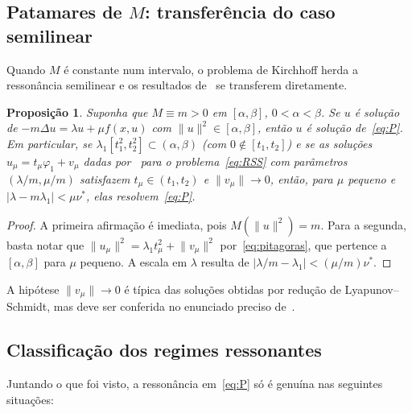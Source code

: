 \documentclass[11pt,a4paper]{article}
\theoremstyle{plain}
\newtheorem{proposicao}[teorema]{Proposição}
\theoremstyle{definition}
\theoremstyle{remark}
\newcommand{\norm}[1]{\lVert #1\rVert}
\newcommand{\abs}[1]{\lvert #1\rvert}
\begin{document}
\subsection{Patamares de \texorpdfstring{$M$}{M}: transferência do caso semilinear}

Quando $M$ é constante num intervalo, o problema de Kirchhoff herda a
ressonância semilinear e os resultados de~\cite{RezendeSanchezSilva2019} se
transferem diretamente.

\begin{proposicao}\label{prop:patamar}
Suponha que $M\equiv m>0$ em $[\alpha,\beta]$, $0<\alpha<\beta$. Se $u$ é
solução de $-m\Delta u=\lambda u+\mu f(x,u)$ com $\norm{u}^2\in[\alpha,\beta]$,
então $u$ é solução de~\eqref{eq:P}. Em particular, se
$\lambda_1[t_1^2,t_2^2]\subset(\alpha,\beta)$ (com $0\notin[t_1,t_2]$) e se as
soluções $u_\mu=t_\mu\varphi_1+v_\mu$ dadas por~\cite{RezendeSanchezSilva2019}
para o problema~\eqref{eq:RSS} com parâmetros $(\lambda/m,\mu/m)$ satisfazem
$t_\mu\in(t_1,t_2)$ e $\norm{v_\mu}\to0$, então, para $\mu$ pequeno e
$\abs{\lambda-m\lambda_1}<\mu\nu^*$, elas resolvem~\eqref{eq:P}.
\end{proposicao}

\begin{proof}
A primeira afirmação é imediata, pois $M(\norm{u}^2)=m$. Para a segunda, basta
notar que $\norm{u_\mu}^2=\lambda_1t_\mu^2+\norm{v_\mu}^2$
por~\eqref{eq:pitagoras}, que pertence a $[\alpha,\beta]$ para $\mu$ pequeno.
A escala em $\lambda$ resulta de
$\abs{\lambda/m-\lambda_1}<(\mu/m)\nu^*$.
\end{proof}

A hipótese $\norm{v_\mu}\to0$ é típica das soluções obtidas por redução de
Lyapunov--Schmidt, mas deve ser conferida no enunciado preciso
de~\cite{RezendeSanchezSilva2019}.

\subsection{Classificação dos regimes ressonantes}

Juntando o que foi visto, a ressonância em~\eqref{eq:P} só é genuína nas
seguintes situações:
\end{document}
